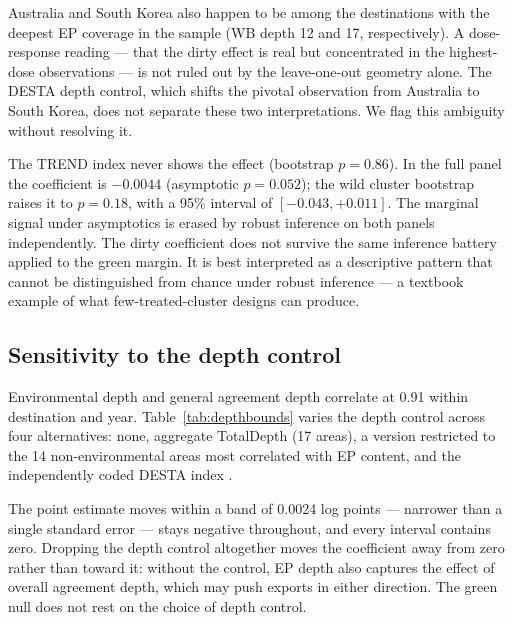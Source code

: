 \documentclass[12pt]{article}
\begin{document}
Australia and South Korea also happen to be among the destinations with the deepest EP coverage in the sample (WB depth 12 and 17, respectively). A dose-response reading --- that the dirty effect is real but concentrated in the highest-dose observations --- is not ruled out by the leave-one-out geometry alone. The DESTA depth control, which shifts the pivotal observation from Australia to South Korea, does not separate these two interpretations. We flag this ambiguity without resolving it.

The TREND index never shows the effect (bootstrap $p = 0.86$). In the full panel the
coefficient is $-0.0044$ (asymptotic $p = 0.052$); the wild cluster bootstrap raises it
to $p = 0.18$, with a 95\% interval of $[-0.043, +0.011]$. The marginal signal under
asymptotics is erased by robust inference on both panels independently. The dirty coefficient does not survive the same inference battery applied to the green margin. It is best interpreted as a descriptive pattern that cannot be distinguished from chance under robust inference --- a textbook example of what few-treated-cluster designs can produce.





\subsection{Sensitivity to the depth control}\label{sec:depthcontrol}

Environmental depth and general agreement depth correlate at 0.91 within destination and
year. Table~\ref{tab:depthbounds} varies the depth control across four alternatives: none,
aggregate TotalDepth (17 areas), a version restricted to the 14 non-environmental areas
most correlated with EP content, and the independently coded DESTA index \citep{dur2014}.

\begin{table}[H]
\centering
\caption{EP$\times$green under alternative depth controls (collapsed panel, WB index)}
\label{tab:depthbounds}

\end{table}

The point estimate moves within a band of 0.0024 log points --- narrower than a single
standard error --- stays negative throughout, and every interval contains zero. Dropping
the depth control altogether moves the coefficient away from zero rather than toward it: without the control, EP depth also captures the effect of overall agreement depth, which may push exports in either direction.
The green null does not rest on the choice of depth control.
\end{document}
